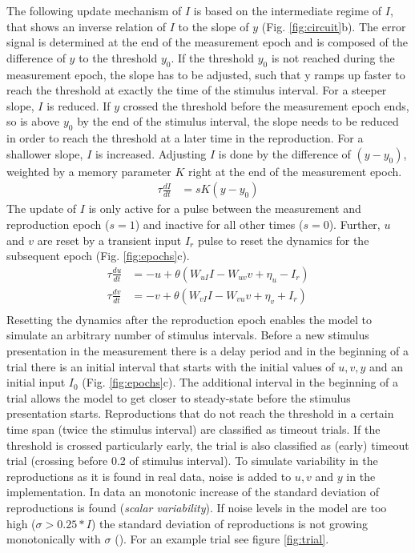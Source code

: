 \documentclass[9pt]{article}
\begin{document}
The following update mechanism of $I$ is based on the intermediate regime of $I$, that shows an inverse relation of $I$ to the slope of $y$ (Fig. \ref{fig:circuit}b).
The error signal is determined at the end of the measurement epoch and is composed of the difference of $y$ to the threshold $y_0$.
If the threshold $y_0$ is not reached during the measurement epoch, the slope has to be adjusted, such that y ramps up faster to reach the threshold at exactly the time of the stimulus interval. For a steeper slope, $I$ is reduced.
If $y$ crossed the threshold before the measurement epoch ends, so is above $y_0$ by the end of the stimulus interval, the slope needs to be reduced in order to reach the threshold at a later time in the reproduction. For a shallower slope, $I$ is increased.
Adjusting $I$ is done by the difference of $(y-y_0)$, weighted by a memory parameter $K$ right at the end of the measurement epoch.
\begin{equation} \label{Iupdate}
	\begin{split}
	\tau\frac{dI}{dt} & = sK(y-y_0)
	\end{split}
\end{equation}
The update of $I$ is only active for a pulse between the measurement and reproduction epoch ($s=1$) and inactive for all other times ($s=0$).
Further, $u$ and $v$ are reset by a transient input $I_r$ pulse to reset the dynamics for the subsequent epoch (Fig. \ref{fig:epochs}c).
\begin{equation} \label{experimentcircuit}
	\begin{split}
	\tau\frac{du}{dt} & = -u + \theta(W_{uI}I - W_{uv}v + \eta_u - I_r) \\
	\tau\frac{dv}{dt} & = -v + \theta(W_{vI}I - W_{vu}v + \eta_v + I_r) \\
	\end{split}
\end{equation}
Resetting the dynamics after the reproduction epoch enables the model to simulate an arbitrary number of stimulus intervals. 
Before a new stimulus presentation in the measurement there is a delay period and in the beginning of a trial there is an initial interval that starts with the initial values of $u, v, y$ and an initial input $I_0$ (Fig. \ref{fig:epochs}c). 
The additional interval in the beginning of a trial allows the model to get closer to steady-state before the stimulus presentation starts. 
Reproductions that do not reach the threshold in a certain time span (twice the stimulus interval) are classified as timeout trials. 
If the threshold is crossed particularly early, the trial is also classified as (early) timeout trial (crossing before 0.2 of stimulus interval).
To simulate variability in the reproductions as it is found in real data, noise is added to $u, v$ and $y$ in the implementation. In data an monotonic increase of the standard deviation of reproductions is found (\textit{scalar variability}). 
If noise levels in the model are too high ($\sigma>0.25*I$) the standard deviation of reproductions is not growing monotonically with $\sigma$ (\cite{Egger2020}). 
For an example trial see figure \ref{fig:trial}. 
\end{document}
